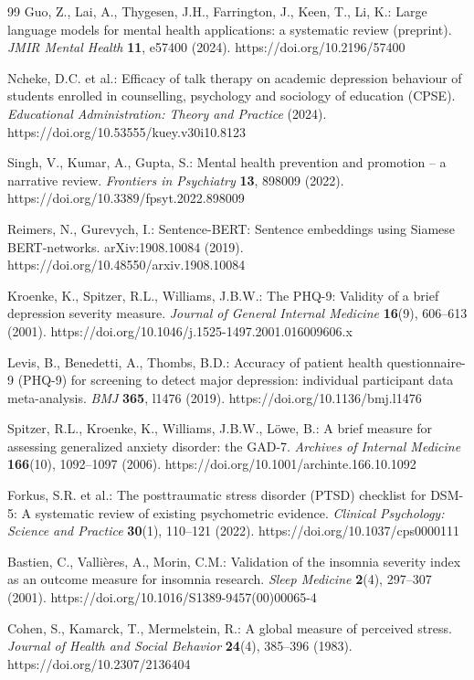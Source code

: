 \documentclass{svproc}
\begin{document}
\begin{thebibliography}{99}
 Guo, Z., Lai, A., Thygesen, J.H., Farrington, J., Keen, T., Li, K.: Large language models for mental health applications: a systematic review (preprint). \textit{JMIR Mental Health} \textbf{11}, e57400 (2024). https://doi.org/10.2196/57400

 Ncheke, D.C. et al.: Efficacy of talk therapy on academic depression behaviour of students enrolled in counselling, psychology and sociology of education (CPSE). \textit{Educational Administration: Theory and Practice} (2024). https://doi.org/10.53555/kuey.v30i10.8123

 Singh, V., Kumar, A., Gupta, S.: Mental health prevention and promotion -- a narrative review. \textit{Frontiers in Psychiatry} \textbf{13}, 898009 (2022). https://doi.org/10.3389/fpsyt.2022.898009

 Reimers, N., Gurevych, I.: Sentence-BERT: Sentence embeddings using Siamese BERT-networks. arXiv:1908.10084 (2019). https://doi.org/10.48550/arxiv.1908.10084

 Kroenke, K., Spitzer, R.L., Williams, J.B.W.: The PHQ-9: Validity of a brief depression severity measure. \textit{Journal of General Internal Medicine} \textbf{16}(9), 606--613 (2001). https://doi.org/10.1046/j.1525-1497.2001.016009606.x

 Levis, B., Benedetti, A., Thombs, B.D.: Accuracy of patient health questionnaire-9 (PHQ-9) for screening to detect major depression: individual participant data meta-analysis. \textit{BMJ} \textbf{365}, l1476 (2019). https://doi.org/10.1136/bmj.l1476

 Spitzer, R.L., Kroenke, K., Williams, J.B.W., L{\"o}we, B.: A brief measure for assessing generalized anxiety disorder: the GAD-7. \textit{Archives of Internal Medicine} \textbf{166}(10), 1092--1097 (2006). https://doi.org/10.1001/archinte.166.10.1092

 Forkus, S.R. et al.: The posttraumatic stress disorder (PTSD) checklist for DSM-5: A systematic review of existing psychometric evidence. \textit{Clinical Psychology: Science and Practice} \textbf{30}(1), 110--121 (2022). https://doi.org/10.1037/cps0000111

 Bastien, C., Valli{\`e}res, A., Morin, C.M.: Validation of the insomnia severity index as an outcome measure for insomnia research. \textit{Sleep Medicine} \textbf{2}(4), 297--307 (2001). https://doi.org/10.1016/S1389-9457(00)00065-4

 Cohen, S., Kamarck, T., Mermelstein, R.: A global measure of perceived stress. \textit{Journal of Health and Social Behavior} \textbf{24}(4), 385--396 (1983). https://doi.org/10.2307/2136404


\end{thebibliography}
\end{document}
